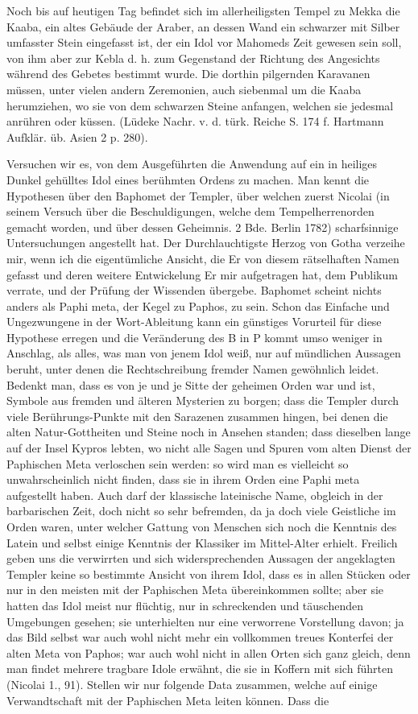 \documentclass[a4paper, 11pt, oneside, polutonikogreek, german]{article}
\begin{document}
Noch bis auf heutigen Tag befindet sich im allerheiligsten Tempel zu Mekka die Kaaba, ein altes Gebäude der Araber, an dessen Wand ein schwarzer mit Silber umfasster Stein eingefasst ist, der ein Idol vor Mahomeds Zeit gewesen sein soll, von ihm aber zur Kebla d. h. zum Gegenstand der Richtung des Angesichts während des Gebetes bestimmt wurde. Die dorthin pilgernden Karavanen müssen, unter vielen andern Zeremonien, auch siebenmal um die Kaaba herumziehen, wo sie von dem schwarzen Steine anfangen, welchen sie jedesmal anrühren oder küssen. (Lüdeke Nachr. v. d. türk. Reiche S. 174 f. Hartmann Aufklär. üb. Asien 2 p. 280).

Versuchen wir es, von dem Ausgeführten die Anwendung auf ein in heiliges Dunkel gehülltes Idol eines berühmten Ordens zu machen. Man kennt die Hypothesen über den Baphomet der Templer, über welchen zuerst Nicolai (in seinem Versuch über die Beschuldigungen, welche dem Tempelherrenorden gemacht worden, und über dessen Geheimnis. 2 Bde. Berlin 1782) scharfsinnige Untersuchungen angestellt hat. Der Durchlauchtigste Herzog von Gotha verzeihe mir, wenn ich die eigentümliche Ansicht, die Er von diesem rätselhaften Namen gefasst und deren weitere Entwickelung Er mir aufgetragen hat, dem Publikum verrate, und der Prüfung der Wissenden übergebe. Baphomet scheint nichts anders als Paphi meta, der Kegel zu Paphos, zu sein. Schon das Einfache und Ungezwungene in der Wort-Ableitung kann ein günstiges Vorurteil für diese Hypothese erregen und die Veränderung des B in P kommt umso weniger in Anschlag, als alles, was man von jenem Idol weiß, nur auf mündlichen Aussagen beruht, unter denen die Rechtschreibung fremder Namen gewöhnlich leidet. Bedenkt man, dass es von je und je Sitte der geheimen Orden war und ist, Symbole aus fremden und älteren Mysterien zu borgen; dass die Templer durch viele Berührungs-Punkte mit den Sarazenen zusammen hingen, bei denen die alten Natur-Gottheiten und Steine noch in Ansehen standen; dass dieselben lange auf der Insel Kypros lebten, wo nicht alle Sagen und Spuren vom alten Dienst der Paphischen Meta verloschen sein werden: so wird man es vielleicht so unwahrscheinlich nicht finden, dass sie in ihrem Orden eine Paphi meta aufgestellt haben. Auch darf der klassische lateinische Name, obgleich in der barbarischen Zeit, doch nicht so sehr befremden, da ja doch viele Geistliche im Orden waren, unter welcher Gattung von Menschen sich noch die Kenntnis des Latein und selbst einige Kenntnis der Klassiker im Mittel-Alter erhielt. Freilich geben uns die verwirrten und sich widersprechenden Aussagen der angeklagten Templer keine so bestimmte Ansicht von ihrem Idol, dass es in allen Stücken oder nur in den meisten mit der Paphischen Meta übereinkommen sollte; aber sie hatten das Idol meist nur flüchtig, nur in schreckenden und täuschenden Umgebungen gesehen; sie unterhielten nur eine verworrene Vorstellung davon; ja das Bild selbst war auch wohl nicht mehr ein vollkommen treues Konterfei der alten Meta von Paphos; war auch wohl nicht in allen Orten sich ganz gleich, denn man findet mehrere tragbare Idole erwähnt, die sie in Koffern mit sich führten (Nicolai 1., 91). Stellen wir nur folgende Data zusammen, welche auf einige Verwandtschaft mit der Paphischen Meta leiten können. Dass die 
\end{document}
